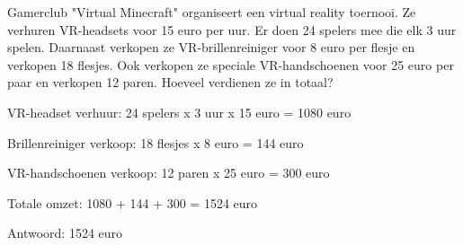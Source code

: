 \begin{opgave}
Gamerclub "Virtual Minecraft" organiseert een virtual reality toernooi. Ze 
verhuren VR-headsets voor 15 euro per uur. Er doen 24 spelers mee die elk 3 
uur spelen. Daarnaast verkopen ze VR-brillenreiniger voor 8 euro per flesje 
en verkopen 18 flesjes. Ook verkopen ze speciale VR-handschoenen voor 25 euro 
per paar en verkopen 12 paren. Hoeveel verdienen ze in totaal?
\end{opgave}

\begin{oplossing}
VR-headset verhuur:
24 spelers x 3 uur x 15 euro = 1080 euro

Brillenreiniger verkoop:
18 flesjes x 8 euro = 144 euro

VR-handschoenen verkoop:
12 paren x 25 euro = 300 euro

Totale omzet:
1080 + 144 + 300 = 1524 euro

Antwoord: 1524 euro
\end{oplossing}